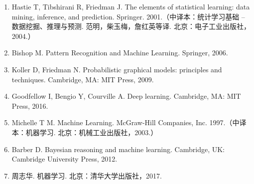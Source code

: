 \documentclass[UTF8,12pt,a4paper,fontset=fandol]{ctexart}
\begin{document}
\begin{enumerate}
  \item Hastie T, Tibshirani R, Friedman J. The elements of statistical learning: data mining, inference, and prediction. Springer. 2001.（中译本：统计学习基础 -- 数据挖掘、推理与预测. 范明，柴玉梅，詹红英等译. 北京：电子工业出版社，2004.）
  \item Bishop M. Pattern Recognition and Machine Learning. Springer, 2006.
  \item Koller D, Friedman N. Probabilistic graphical models: principles and techniques. Cambridge, MA: MIT Press, 2009.
  \item Goodfellow I, Bengio Y, Courville A. Deep learning. Cambridge, MA: MIT Press, 2016.
  \item Michelle T M. Machine Learning. McGraw-Hill Companies, Inc. 1997.（中译本：机器学习. 北京：机械工业出版社，2003.）
  \item Barber D. Bayesian reasoning and machine learning. Cambridge, UK: Cambridge University Press, 2012.
  \item 周志华. 机器学习. 北京：清华大学出版社，2017.
\end{enumerate}
\end{document}
